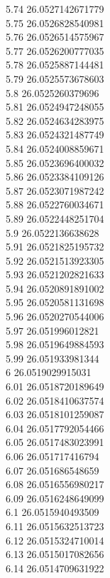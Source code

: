 {5.74	26.0527142671779\\
5.75	26.0526828540981\\
5.76	26.0526514575967\\
5.77	26.0526200777035\\
5.78	26.0525887144481\\
5.79	26.0525573678603\\
5.8	26.0525260379696\\
5.81	26.0524947248055\\
5.82	26.0524634283975\\
5.83	26.0524321487749\\
5.84	26.0524008859671\\
5.85	26.0523696400032\\
5.86	26.0523384109126\\
5.87	26.0523071987242\\
5.88	26.0522760034671\\
5.89	26.0522448251704\\
5.9	26.0522136638628\\
5.91	26.0521825195732\\
5.92	26.0521513923305\\
5.93	26.0521202821633\\
5.94	26.0520891891002\\
5.95	26.0520581131698\\
5.96	26.0520270544006\\
5.97	26.051996012821\\
5.98	26.0519649884593\\
5.99	26.051933981344\\
6	26.0519029915031\\
6.01	26.0518720189649\\
6.02	26.0518410637574\\
6.03	26.0518101259087\\
6.04	26.0517792054466\\
6.05	26.0517483023991\\
6.06	26.051717416794\\
6.07	26.051686548659\\
6.08	26.0516556980217\\
6.09	26.0516248649099\\
6.1	26.0515940493509\\
6.11	26.0515632513723\\
6.12	26.0515324710014\\
6.13	26.0515017082656\\
6.14	26.0514709631922\\
}

